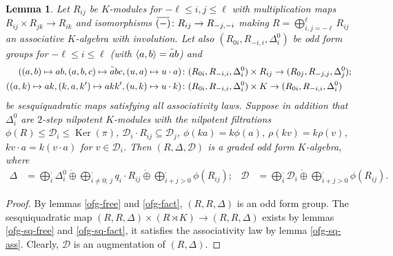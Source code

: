 \documentclass{article}
\newtheorem{lemma}{Lemma}
\theoremstyle{definition}
\newcommand{\dotoplus}{\mathbin{\dot{\oplus}}}
\DeclareMathOperator\Ker{Ker}
\newcommand{\inv}[1]{
    \!\;\overline{
        \!\!\:#1\vphantom !\!\!\:
    }\;\!
}
\begin{document}
\begin{lemma} \label{peirce-ofr}
Let \(R_{ij}\) be \(K\)-modules for \(
    -\ell \leq i, j \leq \ell
\) with multiplication maps \(
    R_{ij} \times R_{jk} \to R_{ik}
\) and isomorphisms \(
    \inv{(-)} \colon R_{ij} \to R_{-j, -i}
\) making \(
    R = \bigoplus_{i, j = -\ell}^\ell R_{ij}
\) an associative \(K\)-algebra with involution. Let also \(
    (R_{0i}, R_{-i, i}, \Delta^0_i)
\) be odd form groups for \(-\ell \leq i \leq \ell\) (with \(\langle a, b \rangle = \inv ab\)) and
\begin{align*}
    (
        (a, b) \mapsto ab,
        (a, b, c) \mapsto \inv abc,
        (u, a) \mapsto u \cdot a
    )
    &\colon (R_{0i}, R_{-i, i}, \Delta^0_i)
    \times R_{ij}
    \to (R_{0j}, R_{-j, j}, \Delta^0_j);
    \\
    (
    (a, k) \mapsto ak,
    (k, a, k') \mapsto akk',
    (u, k) \mapsto u \cdot k
    )
    &\colon (R_{0i}, R_{-i, i}, \Delta^0_i)
    \times K
    \to (R_{0i}, R_{-i, i}, \Delta^0_i)
\end{align*}
be sesquiquadratic maps satisfying all associativity laws. Suppose in addition that \(\Delta^0_i\) are \(2\)-step nilpotent \(K\)-modules with the nilpotent filtrations \(
    \phi(R) \leq \mathcal D_i \leq \Ker(\pi)
\), \(
    \mathcal D_i \cdot R_{ij} \subseteq \mathcal D_j
\), \(
    \phi(ka) = k \phi(a)
\), \(
    \rho(kv) = k \rho(v)
\), \(
    kv \cdot a = k(v \cdot a)
\) for \(v \in \mathcal D_i\). Then \((R, \Delta, \mathcal D)\) is a graded odd form \(K\)-algebra, where
\begin{align*}
    \Delta
    &=
    \bigoplus_i^\cdot \Delta^0_i
    \dotoplus \bigoplus_{i \neq 0;\, j}^\cdot
        q_i \cdot R_{ij}
    \dotoplus \bigoplus_{i + j > 0}^\cdot
        \phi(R_{ij});
    &
    \mathcal D
    &=
    \bigoplus_i^\cdot \mathcal D_i
    \dotoplus \bigoplus_{i + j > 0}^\cdot
        \phi(R_{ij}).
\end{align*}
\end{lemma}
\begin{proof}
By lemmas \ref{ofg-free} and \ref{ofg-fact}, \(
    (R, R, \Delta)
\) is an odd form group. The sesquiquadratic map \(
    (R, R, \Delta) \times (R \rtimes K)
    \to (R, R, \Delta)
\) exists by lemmas \ref{ofg-sq-free} and \ref{ofg-sq-fact}, it satisfies the associativity law by lemma \ref{ofg-sq-ass}. Clearly, \(\mathcal D\) is an augmentation of \((R, \Delta)\).
\end{proof}
\end{document}

